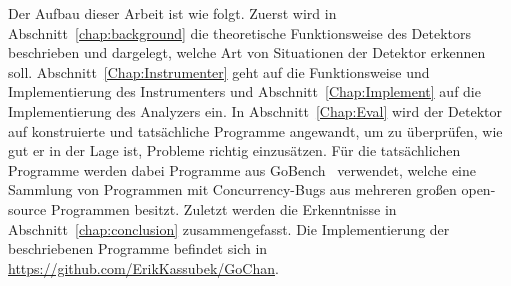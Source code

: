 Der Aufbau dieser Arbeit ist wie folgt. Zuerst wird in Abschnitt~\ref{chap:background}
die theoretische Funktionsweise des Detektors beschrieben und dargelegt, 
welche Art von Situationen der Detektor erkennen soll. 
Abschnitt~\ref{Chap:Instrumenter} geht auf die Funktionsweise und Implementierung 
des Instrumenters und Abschnitt~\ref{Chap:Implement} auf die Implementierung 
des Analyzers ein. In Abschnitt~\ref{Chap:Eval} wird der Detektor auf 
konstruierte und tatsächliche Programme angewandt, um zu überprüfen, 
wie gut er in der Lage ist, Probleme richtig einzusätzen. Für die 
tatsächlichen Programme werden dabei Programme aus GoBench~\cite{gobench}
verwendet, welche eine Sammlung von Programmen mit Concurrency-Bugs aus 
mehreren großen open-source Programmen besitzt. Zuletzt werden die 
Erkenntnisse in Abschnitt~\ref{chap:conclusion} zusammengefasst. Die Implementierung
der beschriebenen Programme befindet sich in \url{https://github.com/ErikKassubek/GoChan}.
